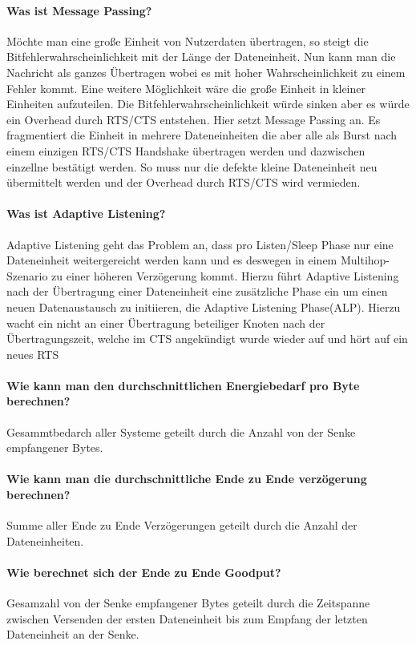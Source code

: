	\paragraph{Was ist Message Passing?}
	Möchte man eine große Einheit von Nutzerdaten übertragen, so steigt die Bitfehlerwahrscheinlichkeit mit der Länge der Dateneinheit. Nun kann man die Nachricht als ganzes Übertragen wobei es mit hoher Wahrscheinlichkeit zu einem Fehler kommt. Eine weitere Möglichkeit wäre die große Einheit in kleiner Einheiten aufzuteilen. Die Bitfehlerwahrscheinlichkeit würde sinken aber es würde ein Overhead durch RTS/CTS entstehen.
	Hier setzt Message Passing an. Es fragmentiert die Einheit in mehrere Dateneinheiten die aber alle als Burst nach einem einzigen RTS/CTS Handshake übertragen werden und dazwischen einzellne bestätigt werden. So muss nur die defekte kleine Dateneinheit neu übermittelt werden und der Overhead durch RTS/CTS wird vermieden.
	
	\paragraph{Was ist Adaptive Listening?}
	Adaptive Listening geht das Problem an, dass pro Listen/Sleep Phase nur eine Dateneinheit weitergereicht werden kann und es deswegen in einem Multihop-Szenario zu einer höheren Verzögerung kommt. 
	Hierzu führt Adaptive Listening nach der Übertragung einer Dateneinheit eine zusätzliche Phase ein um einen neuen Datenaustausch zu initiieren, die Adaptive Listening Phase(ALP). Hierzu wacht ein nicht an einer Übertragung beteiliger Knoten nach der Übertragungszeit, welche im CTS angekündigt wurde wieder auf und hört auf ein neues RTS
	
	\paragraph{Wie kann man den durchschnittlichen Energiebedarf pro Byte berechnen?}
	Gesammtbedarch aller Systeme geteilt durch die Anzahl von der Senke empfangener Bytes.
	
	\paragraph{Wie kann man die durchschnittliche Ende zu Ende verzögerung berechnen?}
	Summe aller Ende zu Ende Verzögerungen geteilt durch die Anzahl der Dateneinheiten.
	
	\paragraph{Wie berechnet sich der Ende zu Ende Goodput?}
		Gesamzahl von der Senke empfangener Bytes geteilt durch die Zeitspanne zwischen Versenden der ersten Dateneinheit bis zum Empfang der letzten Dateneinheit an der Senke.
		
